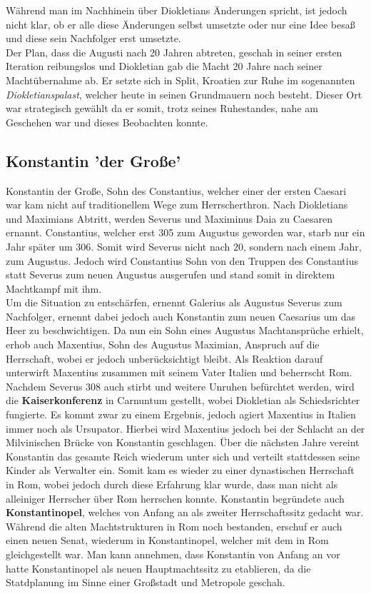 \documentclass{article}
\begin{document}
	Während man im Nachhinein über Diokletians Änderungen spricht, ist jedoch nicht klar, ob er alle diese Änderungen selbst umsetzte oder nur eine Idee besaß und diese sein Nachfolger erst umsetzte. \\
	Der Plan, dass die Augusti nach 20 Jahren abtreten, geschah in seiner ersten Iteration reibungslos und Diokletian gab die Macht 20 Jahre nach seiner Machtübernahme ab. Er setzte sich in Split, Kroatien zur Ruhe im sogenannten \textit{Diokletianspalast}, welcher heute in seinen Grundmauern noch besteht. Dieser Ort war strategisch gewählt da er somit, trotz seines Ruhestandes, nahe am Geschehen war und dieses Beobachten konnte. \\
	\subsection{Konstantin 'der Große'}
	Konstantin der Große, Sohn des Constantius, welcher einer der ersten Caesari war kam nicht auf traditionellem Wege zum Herrscherthron. Nach Diokletians und Maximians Abtritt, werden Severus und Maximinus Daia zu Caesaren ernannt. Constantius, welcher erst 305 zum Augustus geworden war, starb nur ein Jahr später um 306. Somit wird Severus nicht nach 20, sondern nach einem Jahr, zum Augustus. Jedoch wird Constantius Sohn von den Truppen des Constantius statt Severus zum neuen Augustus ausgerufen und stand somit in direktem Machtkampf mit ihm. \\
	Um die Situation zu entschärfen, ernennt Galerius als Augustus Severus zum Nachfolger, ernennt dabei jedoch auch Konstantin zum neuen Caesarius um das Heer zu beschwichtigen. Da nun ein Sohn eines Augustus Machtansprüche erhielt, erhob auch Maxentius, Sohn des Augustus Maximian, Anspruch auf die Herrschaft, wobei er jedoch unberücksichtigt bleibt. Als Reaktion darauf unterwirft Maxentius zusammen mit seinem Vater Italien und beherrscht Rom. \\
	Nachdem Severus 308 auch stirbt und weitere Unruhen befürchtet werden, wird die \textbf{Kaiserkonferenz} in Carnuntum gestellt, wobei Diokletian als Schiedsrichter fungierte. Es kommt zwar zu einem Ergebnis, jedoch agiert Maxentius in Italien immer noch als Ursupator. Hierbei wird Maxentius jedoch bei der Schlacht an der Milvinischen Brücke von Konstantin geschlagen. Über die nächsten Jahre vereint Konstantin das gesamte Reich wiederum unter sich und verteilt stattdessen seine Kinder als Verwalter ein. Somit kam es wieder zu einer dynastischen Herrschaft in Rom, wobei jedoch durch diese Erfahrung klar wurde, dass man nicht als alleiniger Herrscher über Rom herrschen konnte. Konstantin begründete auch \textbf{Konstantinopel}, welches von Anfang an als zweiter Herrschaftssitz gedacht war. Während die alten Machtstrukturen in Rom noch bestanden, erschuf er auch einen neuen Senat, wiederum in Konstantinopel, welcher mit dem in Rom gleichgestellt war. Man kann annehmen, dass Konstantin von Anfang an vor hatte Konstantinopel als neuen Hauptmachtssitz zu etablieren, da die Statdplanung im Sinne einer Großstadt und Metropole geschah.


























	
\end{document}
